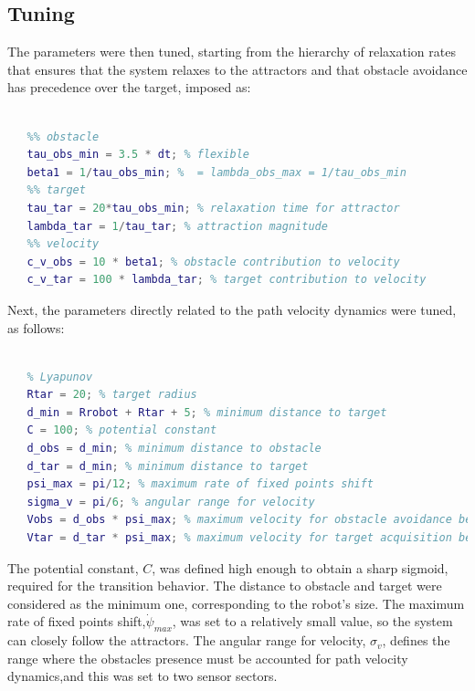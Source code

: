 \subsection{Tuning}%
\label{sec:tuning-lyapunov}
The parameters were then tuned, starting from the hierarchy of relaxation rates that
ensures that the system relaxes to the attractors and that obstacle avoidance
has precedence over the target, imposed as:
%
\begin{lstlisting}[language=matlab, caption={Relaxation rates tuning},label=lst:program-dyn-lyapunov-relax-tuning,
style=custom-matlab]%

   %% obstacle
   tau_obs_min = 3.5 * dt; % flexible
   beta1 = 1/tau_obs_min; %  = lambda_obs_max = 1/tau_obs_min
   %% target
   tau_tar = 20*tau_obs_min; % relaxation time for attractor
   lambda_tar = 1/tau_tar; % attraction magnitude
   %% velocity
   c_v_obs = 10 * beta1; % obstacle contribution to velocity
   c_v_tar = 100 * lambda_tar; % target contribution to velocity

\end{lstlisting}

Next, the parameters directly related to the path velocity dynamics were tuned,
as follows:
%
\begin{lstlisting}[language=matlab, caption={Path velocity parameters tuning},label=lst:program-dyn-lyapunov-veloc-tuning,
style=custom-matlab]%

   % Lyapunov
   Rtar = 20; % target radius
   d_min = Rrobot + Rtar + 5; % minimum distance to target
   C = 100; % potential constant
   d_obs = d_min; % minimum distance to obstacle
   d_tar = d_min; % minimum distance to target
   psi_max = pi/12; % maximum rate of fixed points shift
   sigma_v = pi/6; % angular range for velocity
   Vobs = d_obs * psi_max; % maximum velocity for obstacle avoidance behavior
   Vtar = d_tar * psi_max; % maximum velocity for target acquisition behavior

\end{lstlisting}
The potential constant, $C$, was defined high enough to obtain a sharp sigmoid,
required for the transition behavior. The distance to obstacle and target were
considered as the minimum one, corresponding to the robot's size. The maximum
rate of fixed points shift,$\dot \psi_{max}$, was set to a relatively small
value, so the system can closely follow the attractors. The angular range for
velocity, $\sigma_v$, defines the range where the obstacles presence must be
accounted for path velocity dynamics,and this was set to two sensor sectors.

